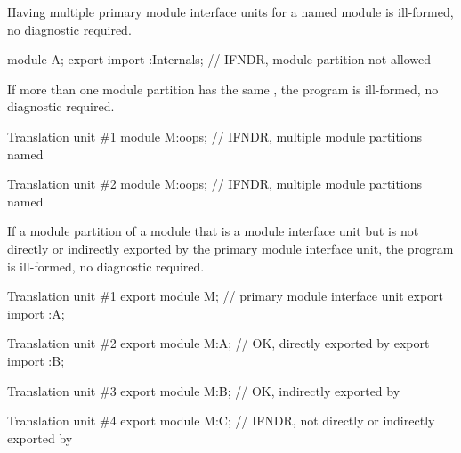 
\pnum
Having multiple primary module interface units
for a named module
is ill-formed, no diagnostic required.

\pnum
\begin{example}
\begin{codeblock}
module A;
export import :Internals;       // IFNDR, module partition not allowed
\end{codeblock}
\end{example}


\pnum
If more than one module partition
has the same ,
the program is ill-formed, no diagnostic required.

\pnum
\begin{example}
\begin{codeblocktu}{Translation unit \#1}
module M:oops;  // IFNDR, multiple module partitions named 
\end{codeblocktu}
\begin{codeblocktu}{Translation unit \#2}
module M:oops;  // IFNDR, multiple module partitions named 
\end{codeblocktu}
\end{example}


\pnum
If a module partition of a module
that is a module interface unit
but is not directly or indirectly exported
by the primary module interface unit,
the program is ill-formed, no diagnostic required.

\pnum
\begin{example}
\begin{codeblocktu}{Translation unit \#1}
export module M;    // primary module interface unit
export import :A;
\end{codeblocktu}
\begin{codeblocktu}{Translation unit \#2}
export module M:A;  // OK, directly exported by 
export import :B;
\end{codeblocktu}
\begin{codeblocktu}{Translation unit \#3}
export module M:B;  // OK, indirectly exported by 
\end{codeblocktu}
\begin{codeblocktu}{Translation unit \#4}
export module M:C;  // IFNDR, not directly or indirectly exported by 
\end{codeblocktu}
\end{example}

